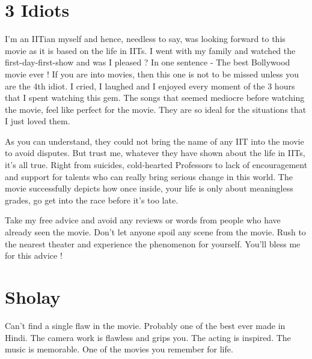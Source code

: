 \documentclass{article}
\begin{document}
\section{3 Idiots}
	
I'm an IITian myself and hence, needless to say, was looking forward to this movie as it is based on the life in IITs. I went with my family and watched the first-day-first-show and was I pleased ? In one sentence - The best Bollywood movie ever ! If you are into movies, then this one is not to be missed unless you are the 4th idiot. I cried, I laughed and I enjoyed every moment of the 3 hours that I spent watching this gem. The songs that seemed mediocre before watching the movie, feel like perfect for the movie. They are so ideal for the situations that I just loved them.

As you can understand, they could not bring the name of any IIT into the movie to avoid disputes. But trust me, whatever they have shown about the life in IITs, it's all true. Right from suicides, cold-hearted Professors to lack of encouragement and support for talents who can really bring serious change in this world. The movie successfully depicts how once inside, your life is only about meaningless grades, go get into the race before it's too late.

Take my free advice and avoid any reviews or words from people who have already seen the movie. Don't let anyone spoil any scene from the movie. Rush to the nearest theater and experience the phenomenon for yourself. You'll bless me for this advice !

\section{Sholay}
	

Can't find a single flaw in the movie. Probably one of the best ever made in Hindi. The camera work is flawless and grips you. The acting is inspired. The music is memorable. One of the movies you remember for life.
\end{document}
